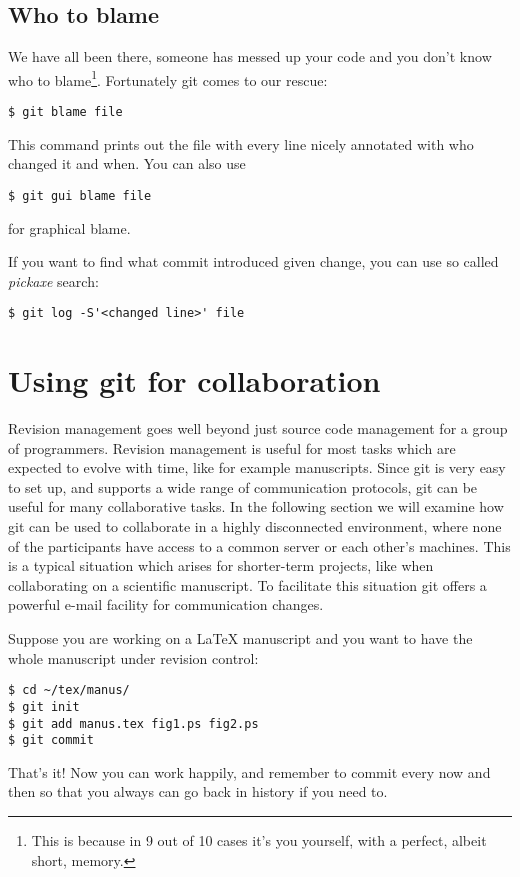 \documentclass[a4paper,10pt]{article}
\begin{document}
\subsection{Who to blame}
\label{sec:blame}
We have all been there, someone has messed up your code and you don't know who
to blame\footnote{This is because in 9 out of 10 cases it's you yourself,
with a perfect, albeit short, memory.}.
Fortunately git comes to our rescue:
\begin{verbatim}
$ git blame file
\end{verbatim}
This command prints out the file with every line nicely annotated with who 
changed it and when.
You can also use
\begin{verbatim}
$ git gui blame file
\end{verbatim}
for graphical blame.

If you want to find what commit introduced given change, you can use
so called \emph{pickaxe} search:
\begin{verbatim}
$ git log -S'<changed line>' file
\end{verbatim}


\section{Using git for collaboration}
Revision management goes well beyond just source code management for a group
of programmers. Revision management is useful for most tasks which are
expected to evolve with time, like for example manuscripts.
Since git is very easy to set up, and supports a wide range of communication
protocols, git can be useful for many collaborative tasks. In the following
section we will examine how git can be used to collaborate in a highly
disconnected environment, where none of the participants have access to a
common server or each other's machines. This is a typical situation which
arises for shorter-term projects, like when collaborating on a scientific
manuscript. To facilitate this situation git offers a powerful e-mail facility
for communication changes.

Suppose you are working on a LaTeX manuscript and you want to have the whole
manuscript under revision control:
\begin{verbatim}
$ cd ~/tex/manus/
$ git init
$ git add manus.tex fig1.ps fig2.ps
$ git commit
\end{verbatim}
That's it! Now you can work happily, and remember to commit every now and then
so that you always can go back in history if you need to. 
\end{document}
